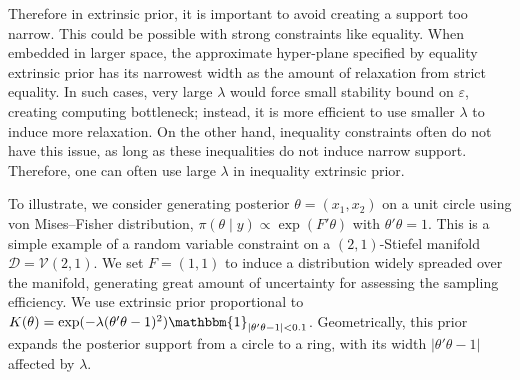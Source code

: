\documentclass[10pt]{article}
\newcommand{\mc}[1]{\mathcal{#1}}
\DeclareMathOperator{\1}{\mathbbm{1}}
\begin{document}
Therefore in extrinsic prior, it is important to avoid creating a support too narrow. This could be possible with strong constraints like equality. When embedded in larger space, the approximate hyper-plane specified by equality extrinsic prior has its narrowest width as the amount of relaxation from strict equality. In such cases, very large $\lambda$ would force small stability bound on $\varepsilon$, creating computing bottleneck; instead, it is more efficient to use smaller $\lambda$ to induce more relaxation. On the other hand, inequality constraints often do not have this issue, as long as these inequalities do not induce narrow support. Therefore, one can often use large $\lambda$ in inequality extrinsic prior.

To illustrate, we consider generating posterior $\theta=(x_1,x_2)$ on a unit circle using von Mises--Fisher distribution, $\pi(\theta \mid y) \propto \exp(F'\theta)$ with $\theta'\theta =1$. This is a simple example of a random variable constraint on a $(2,1)$-Stiefel manifold $\mc D =\mc V(2,1)$. We set $F=(1,1)$ to induce a distribution widely spreaded over the manifold, generating great amount of uncertainty for assessing the sampling efficiency. We use extrinsic prior proportional to $K(\theta)= \exp(-\lambda (\theta'\theta -1)^2) \mathbbm{1}_{|\theta'\theta -1|<0.1}$. Geometrically, this prior expands the posterior support from a circle to a ring, with its width $|\theta'\theta -1|$ affected by $\lambda$.
\end{document}
